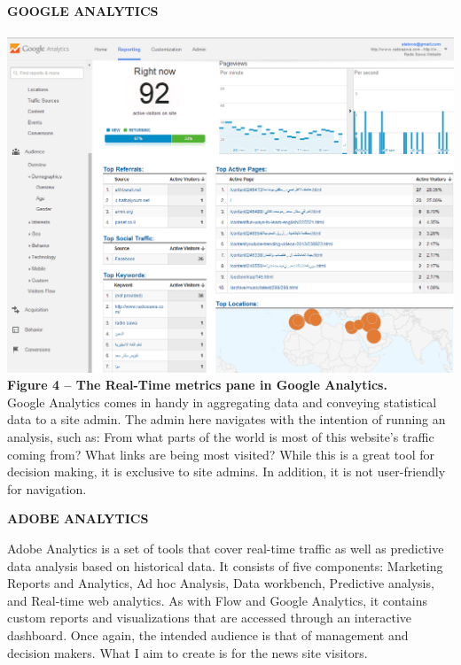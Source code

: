 \documentclass[12pt]{article}
\begin{document}
\noindent\textbf{GOOGLE ANALYTICS} \\ \\
\noindent\includegraphics[scale=0.4]{img/google_analytics} \\
\noindent\textbf{Figure 4 -- The Real-Time metrics pane in Google Analytics.} \\

Google Analytics comes in handy in aggregating data and conveying statistical data to a site admin. The admin here navigates with the intention of running an analysis, such as: From what parts of the world is most of this website's traffic coming from? What links are being most visited?
While this is a great tool for decision making, it is exclusive to site admins. In addition, it is not user-friendly for navigation. \\

\newpage

\noindent\textbf{ADOBE ANALYTICS}

Adobe Analytics is a set of tools that cover real-time traffic as well as predictive data analysis based on historical data. It consists of five components: Marketing Reports and Analytics, Ad hoc Analysis, Data workbench, Predictive analysis, and Real-time web analytics. As with Flow and Google Analytics, it contains custom reports and visualizations that are accessed through an interactive dashboard. Once again, the intended audience is that of management and decision makers. What I aim to create is for the news site visitors. \\
\end{document}

